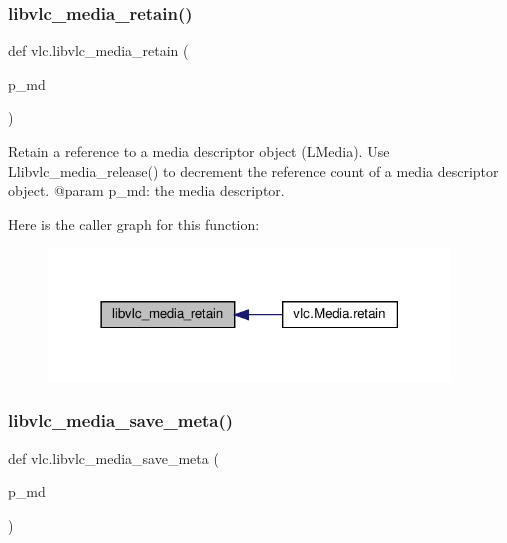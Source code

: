 \subsubsection{\texorpdfstring{libvlc\+\_\+media\+\_\+retain()}{libvlc\_media\_retain()}}
{\footnotesize\ttfamily def vlc.\+libvlc\+\_\+media\+\_\+retain (\begin{DoxyParamCaption}\item[{}]{p\+\_\+md }\end{DoxyParamCaption})}

\begin{DoxyVerb}Retain a reference to a media descriptor object (L{Media}). Use
L{libvlc_media_release}() to decrement the reference count of a
media descriptor object.
@param p_md: the media descriptor.
\end{DoxyVerb}
 Here is the caller graph for this function\+:
\nopagebreak
\begin{figure}[H]
\begin{center}
\leavevmode
\includegraphics[width=302pt]{namespacevlc_a2b167bfab4fb7404a19959b120c74587_icgraph}
\end{center}
\end{figure}
\mbox{\label{namespacevlc_ad95c7299c647fa68384b974e4561f9b4}} 
\subsubsection{\texorpdfstring{libvlc\+\_\+media\+\_\+save\+\_\+meta()}{libvlc\_media\_save\_meta()}}
{\footnotesize\ttfamily def vlc.\+libvlc\+\_\+media\+\_\+save\+\_\+meta (\begin{DoxyParamCaption}\item[{}]{p\+\_\+md }\end{DoxyParamCaption})}

